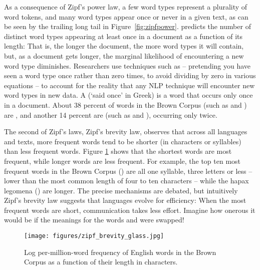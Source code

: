 As a consequence of Zipf's power law, a few word types represent a
plurality of word tokens, and many word types appear once or never in
a given text, as can be seen by the trailing long tail in
Figure~\ref{fig:zipfpower}.   \citep{Heaps:1978} predicts the number
of distinct word types appearing at least once in a document as a
function of its length: That is, the longer the document, the more word
types it will contain, but, as a document gets longer, the marginal
likelihood of encountering a new word type diminishes.  Researchers
use techniques such as  --
pretending you have seen a word type once rather than zero times, to
avoid dividing by zero in various equations -- to account for the
reality that any NLP technique will encounter
new word types in new data.  A  (`said once' in Greek) is a word that occurs only once in a document.  About 38 percent of words in the Brown Corpus (such as  and ) are , and another 14 percent are  (such as  and ), occurring only twice. 

The second of Zipf's laws, Zipf's brevity law, observes that across
all languages and texts, more frequent words tend to be shorter (in
characters or syllables) than less frequent words. Figure
\ref{fig:zipfbrevity} shows that the shortest
words are most frequent, while longer words are less frequent. For
example, the top ten most frequent words in the Brown Corpus
() are all one
syllable, three letters or less -- lower than the most common length
of four to ten characters -- while the hapax legomena
() are longer.  The precise mechanisms
are debated, but intuitively Zipf's brevity law suggests that
languages evolve for efficiency: When the most frequent words are
short, communication takes less effort.  Imagine how onerous it would
be if the meanings for the words  and 
were swapped!

\begin{figure}[htbp]
\centering
  \texttt{[image: figures/zipf\_brevity\_glass.jpg]}
  \caption{Log per-million-word frequency of English words in the Brown Corpus as a function of their length in characters.}
  \label{fig:zipfbrevity}
  \end{figure}


